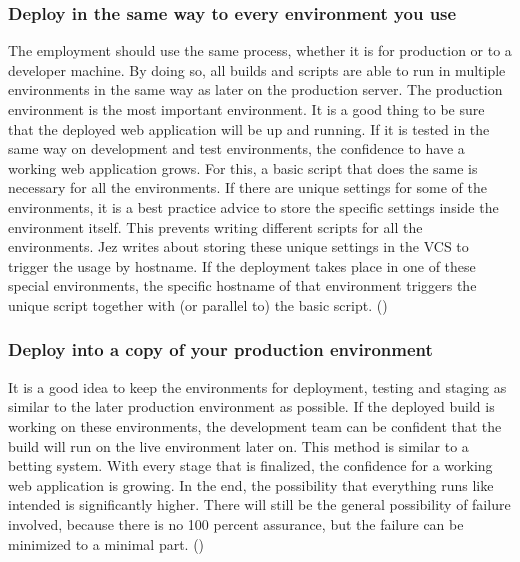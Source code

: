 \subsubsection{Deploy in the same way to every environment you use}
The employment should use the same process, whether it is for production or to a developer machine. By doing so, all builds and scripts are able to
run in multiple environments in the same way as later on the production server. The production environment is the most important environment.
It is a good thing to be sure that the deployed web application will be up and running. If it is tested in the same way on development and test environments,
the confidence to have a working web application grows. For this, a basic script that does the same is necessary for all the environments. If there are
unique settings for some of the environments, it is a best practice advice to store the specific settings inside the environment itself. This prevents
writing different scripts for all the environments. Jez writes about storing these unique settings in the VCS to trigger the usage by hostname.
If the deployment takes place in one of these special environments, the specific hostname of that environment triggers the unique script together with (or parallel to)
the basic script.
(\cite{humble2010continuous})

\subsubsection{Deploy into a copy of your production environment}
It is a good idea to keep the environments for deployment, testing and staging as similar to the later production environment as possible. If the deployed build
is working on these environments, the development team can be confident that the build will run on the live environment later on. This method is similar to
a betting system. With every stage that is finalized, the confidence for a working web application is growing. In the end, the possibility that everything runs like
intended is significantly higher. There will still be the general possibility of failure involved, because there is no 100 percent assurance, but the
failure can be minimized to a minimal part. (\cite{humble2010continuous})

